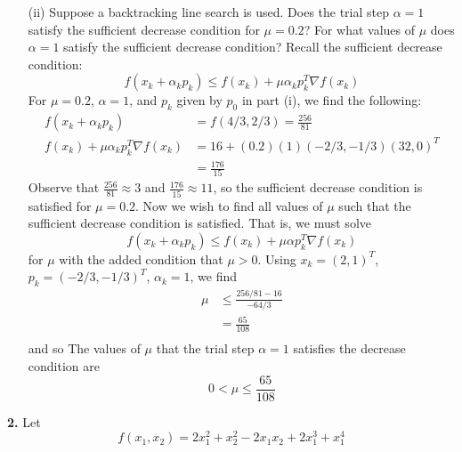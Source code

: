 \documentclass{article}
\begin{document}
\begin{itemize}
    \item[(ii)] Suppose a backtracking line search is used. Does the trial step $\alpha = 1$ satisfy the sufficient decrease condition for $\mu = 0.2$? For what values of $\mu$ does $\alpha = 1$ satisfy the sufficient decrease condition?
    \newline\newline
    Recall the sufficient decrease condition:
    \[f(x_k + \alpha_kp_k) \leq f(x_k) + \mu\alpha_kp_k^T\nabla f(x_k)\]
    For $\mu = 0.2$, $\alpha = 1$, and $p_k$ given by $p_0$ in part (i), we find the following:
    \begin{align*}
        f(x_k + \alpha_kp_k) &= f(4/3, 2/3) = \frac{256}{81}\\
        f(x_k) + \mu\alpha_kp_k^T\nabla f(x_k) &= 16 + (0.2)(1)(-2/3,-1/3)(32,0)^T\\
        &= \frac{176}{15}
    \end{align*}
    Observe that $\frac{256}{81} \approx 3$ and $\frac{176}{15} \approx 11$, so the sufficient decrease condition is satisfied for $\mu = 0.2$. Now we wish to find all values of $\mu$ such that the sufficient decrease condition is satisfied. That is, we must solve 
    \[f(x_k + \alpha_kp_k) \leq f(x_k) + \mu\alpha p_k^T\nabla f(x_k)\]
    for $\mu$ with the added condition that $\mu > 0$. Using $x_k = (2,1)^T$, $p_k = (-2/3,-1/3)^T$, $\alpha_k = 1$, we find
    \begin{align*}
        \mu &\leq \frac{256/81 - 16}{-64/3} \\
        &= \frac{65}{108}\\
    \end{align*}
    and so The values of $\mu$ that the trial step $\alpha = 1$ satisfies the decrease condition are
    \[0 < \mu \leq \frac{65}{108}\]
    \newline
\end{itemize}
\textbf{2.} Let
\[f(x_1,x_2) = 2x_1^2 + x_2^2 - 2x_1x_2 + 2x_1^3 + x_1^4\]
\end{document}
